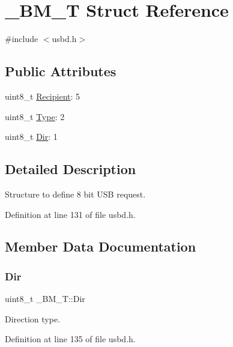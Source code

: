 \hypertarget{struct___b_m___t}{}\section{\+\_\+\+B\+M\+\_\+T Struct Reference}
\label{struct___b_m___t}


{\ttfamily \#include $<$usbd.\+h$>$}

\subsection*{Public Attributes}
\begin{DoxyCompactItemize}
\item 
uint8\+\_\+t \hyperlink{struct___b_m___t_a94927112fe5f66edfe58f7b357619128}{Recipient}\+: 5
\item 
uint8\+\_\+t \hyperlink{struct___b_m___t_a5fd0780bac15d2e87e04493d68941415}{Type}\+: 2
\item 
uint8\+\_\+t \hyperlink{struct___b_m___t_aabd052fb91ef09c571cd697a3f2cbf3f}{Dir}\+: 1
\end{DoxyCompactItemize}


\subsection{Detailed Description}
Structure to define 8 bit U\+SB request. 

Definition at line 131 of file usbd.\+h.



\subsection{Member Data Documentation}
\mbox{\label{struct___b_m___t_aabd052fb91ef09c571cd697a3f2cbf3f}} 
\subsubsection{\texorpdfstring{Dir}{Dir}}
{\footnotesize\ttfamily uint8\+\_\+t \+\_\+\+B\+M\+\_\+\+T\+::\+Dir}

Direction type. 

Definition at line 135 of file usbd.\+h.

\mbox{\label{struct___b_m___t_a94927112fe5f66edfe58f7b357619128}} 
